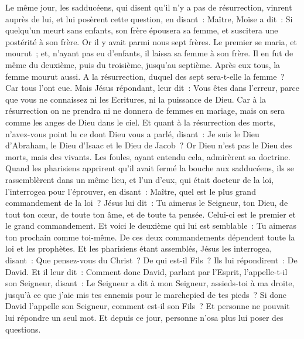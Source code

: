 \begin{multicols}{2}
Le même jour, les sadducéens, qui disent qu'il n'y a pas de résurrection, vinrent auprès de lui, et lui posèrent cette question,
en disant~: Maître, Moïse a dit~: Si quelqu'un meurt sans enfants, son frère épousera sa femme, et suscitera une postérité à son frère.
Or il y avait parmi nous sept frères. Le premier se maria, et mourut~; et, n'ayant pas eu d'enfants, il laissa sa femme à son frère.
Il en fut de même du deuxième, puis du troisième, jusqu'au septième.
Après eux tous, la femme mourut aussi.
A la résurrection, duquel des sept sera-t-elle la femme~? Car tous l'ont eue.
Mais Jésus répondant, leur dit~: Vous êtes dans l'erreur, parce que vous ne connaissez ni les Ecritures, ni la puissance de Dieu.
Car à la résurrection on ne prendra ni ne donnera de femmes en mariage, mais on sera comme les anges de Dieu dans le ciel.
Et quant à la résurrection des morts, n'avez-vous point lu ce dont Dieu vous a parlé, disant~:
Je suis le Dieu d'Abraham, le Dieu d'Isaac et le Dieu de Jacob~? Or Dieu n'est pas le Dieu des morts, mais des vivants.
Les foules, ayant entendu cela, admirèrent sa doctrine.
Quand les pharisiens apprirent qu'il avait fermé la bouche aux sadducéens, ils se rassemblèrent dans un même lieu,
et l'un d'eux, qui était docteur de la loi, l'interrogea pour l'éprouver, en disant~:
Maître, quel est le plus grand commandement de la loi~?
Jésus lui dit~: Tu aimeras le Seigneur, ton Dieu, de tout ton cœur, de toute ton âme, et de toute ta pensée.
Celui-ci est le premier et le grand commandement.
Et voici le deuxième qui lui est semblable~: Tu aimeras ton prochain comme toi-même.
De ces deux commandements dépendent toute la loi et les prophètes.
Et les pharisiens étant assemblés, Jésus les interrogea,
disant~: Que pensez-vous du Christ~? De qui est-il Fils~? Ils lui répondirent~: De David.
Et il leur dit~: Comment donc David, parlant par l'Esprit, l'appelle-t-il son Seigneur, disant~:
Le Seigneur a dit à mon Seigneur, assieds-toi à ma droite, jusqu'à ce que j'aie mis tes ennemis pour le marchepied de tes pieds~?
Si donc David l'appelle son Seigneur, comment est-il son Fils~?
Et personne ne pouvait lui répondre un seul mot. Et depuis ce jour, personne n'osa plus lui poser des questions.

\end{multicols}
